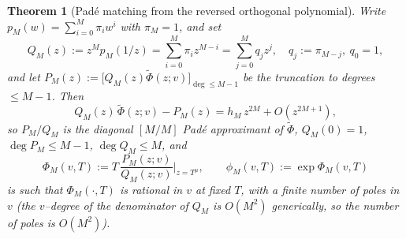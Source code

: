 \documentclass[11pt]{article}
\newtheorem{theorem}{Theorem}[section]
\begin{document}
\begin{theorem}[Pad\'e matching from the reversed orthogonal polynomial]
\label{thm:match}
Write $p_M(w)=\sum_{i=0}^M\pi_i w^i$ with $\pi_M=1$, and set
\begin{equation}\label{eq:QP-def}
Q_M(z):=z^M p_M(1/z)=\sum_{i=0}^M\pi_i z^{M-i}=\sum_{j=0}^M q_j z^{j},
\quad q_j:=\pi_{M-j},\ q_0=1,
\end{equation}
and let $P_M(z):=\bigl[Q_M(z)\widetilde\Phi(z;v)\bigr]_{\deg\le M-1}$ be the
truncation to degrees $\le M-1$. Then
\begin{equation}\label{eq:match}
Q_M(z)\,\widetilde\Phi(z;v)-P_M(z)=h_M\,z^{2M}+O(z^{2M+1}),
\end{equation}
so $P_M/Q_M$ is the diagonal $[M/M]$ Pad\'e approximant of $\widetilde\Phi$,
$Q_M(0)=1$, $\deg P_M\le M-1$, $\deg Q_M\le M$, and
\begin{equation}\label{eq:PhiM-def}
\Phi_M(v,T):=T\,\frac{P_M(z;v)}{Q_M(z;v)}\bigg|_{z=T^{\mu}},\qquad
\phi_M(v,T):=\exp\Phi_M(v,T)
\end{equation}
is such that $\Phi_M(\cdot,T)$ is rational in $v$ at fixed $T$, with a finite
number of poles in $v$ (the $v$--degree of the denominator of $Q_M$ is
$O(M^2)$ generically, so the number of poles is $O(M^2)$).
\end{theorem}
\end{document}
